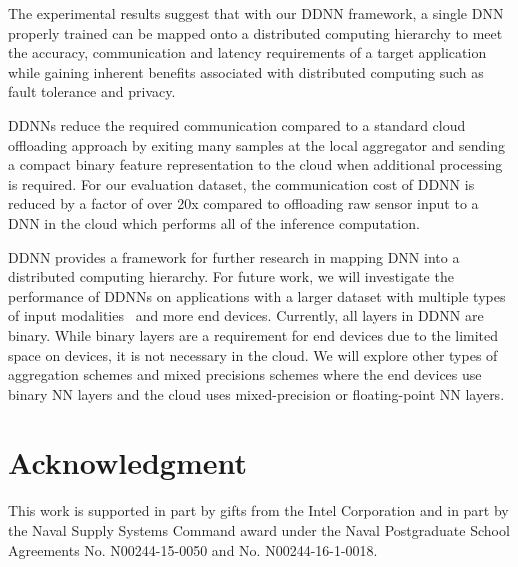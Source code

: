\documentclass[10pt, conference, compsocconf]{IEEEtran}
\begin{document}
The experimental results suggest that with our DDNN framework, a single DNN properly trained can be mapped onto a distributed computing hierarchy to meet the accuracy, communication and latency requirements of a target application while gaining inherent benefits associated with distributed computing such as fault tolerance and privacy. 

DDNNs reduce the required communication compared to a standard cloud offloading approach by exiting many samples at the local aggregator and sending a compact binary feature representation to the cloud when additional processing is required. For our evaluation dataset, the communication cost of DDNN is reduced by a factor of over 20x compared to offloading raw sensor input to a DNN in the cloud which performs all of the inference computation.

DDNN provides a framework for further research in mapping DNN into a distributed computing hierarchy. For future work, we will investigate the performance of DDNNs on applications with a larger dataset with multiple types of input modalities~\cite{cha2015multimodal} and more end devices. Currently, all layers in DDNN are binary. While binary layers are a requirement for end devices due to the limited space on devices, it is not necessary in the cloud. We will explore other types of aggregation schemes and mixed precisions schemes where the end devices use binary NN layers and the cloud uses mixed-precision or floating-point NN layers.

\section*{Acknowledgment}
This work is supported in part by gifts from the Intel Corporation
and in part by the Naval Supply Systems Command
award under the Naval Postgraduate School Agreements No.
N00244-15-0050 and No. N00244-16-1-0018.



\end{document}
